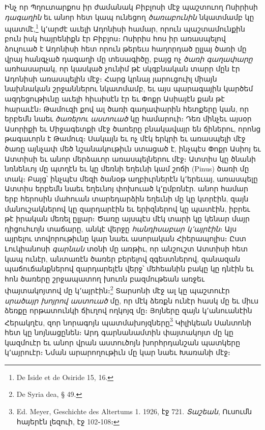 \documentclass{article}
\begin{document}
{Ինչ որ Պղուտարքոս իր ժամանակ Բիբլոսի մէջ պաշտուող Ոսիրիսի \emph{դագաղին} եւ անոր հետ կապ ունեցող \emph{ծառաբունին} նկատմամբ կը պատմէ,\footnote{De Iside et de Osiride 15, 16.} կ՚արժէ աւելի Ադոնիսի համար, որուն պաշտամունքին բուն իսկ հայրենիքն էր Բիբլոս։ Ոսիրիս հոս իր առասպելով ձուլուած է Ադոնիսի հետ որուն թերեւս հաղորդած ըլլայ ծառի մը վրայ հանգչած դագաղի մը տեսագիծը, բայց ոչ \emph{ծառի գաղափարը} առհասարակ, որ կասկած չունիմ թէ սկզբնական տարր մըն էր Ադոնիսի առասպելին մէջ։ Հարց կրնայ յարուցուիլ միայն նախնական շրջաններու նկատմամբ, եւ այս պարագային կարծեմ ազդեցութիւնը աւելի հիւսիսէն էր եւ Փոքր Ասիայէն քան թէ հարաւէն։ Թամուզի քով ալ ծառի գաղափարին հետքերը կան, որ երբեմն նաեւ \emph{ծառերու աստուած} կը համարուի։ Դեռ մինչեւ այսօր Ասորիքի եւ Միջագետքի մէջ ծառերը բնակավայր են ճիներու, որոնց թագաւորն է Թամուզ։ Սակայն եւ ոչ մէկ երկրի եւ առասպելի մէջ ծառը այնչափ մեծ նշանակութիւն ստացած է, ինչպէս Փոքր Ասիոյ եւ Ատտիսի եւ անոր մերձաւոր առասպելներու մէջ։ Ատտիս կը ծնանի նռնենւոյ մը պտղէն եւ կը մեռնի եղեւնի կամ շոճի (Pinus) ծառի մը տակ։ Բայց՝ ինչպէս մեզի ծանօթ աղբիւրներէն կ՚երեւայ, առասպելը Ատտիս երբեմն նաեւ եղեւնոյ փոխուած կ՚ըմբռնէր. անոր համար երբ հերոսին մահուան տարեդարձին եղեւնի մը կը կտրէին, զայն մանուշակներով կը զարդարէին եւ երիզներով կը պատէին, իբրեւ թէ իրական մեռել ըլլար։ Ծառը այսպէս մէկ տարի կը կենար մայր դիցուհւոյն տաճարը, անկէ վերջը \emph{հանդիսաբար կ՚այրէին}։ Այս այրելու տովորութիւնը կար նաեւ ասորական Հիերապոլիս։ Ըստ Լուկիանոսի \emph{գարնան} տօնի մը առթիւ, որ անշուշտ Ատտիսի հետ կապ ունէր, անտառէն ծառեր բերելով զգեստներով, զանազան պաճուճանքներով զարդարելէն վերջ՝ մեհեանին բակը կը դնէին եւ հոն ծառերը շրջապատող խուռն բազմութեան առջեւ փայտակոյտով մը կ՚այրէին։\footnote{De Syria dea, § 49.} Տարսոնի մէջ ալ կը պաշտուէր \emph{սրածայր խոյրով աստուած} մը, որ մէկ ձեռքն ունէր հասկ մը եւ միւս ձեռքը որթատունկի ճիւղով ողկոյզ մը։ Յոյները զայն կ՚անուանէին Հերակղէս, զոր նորագոյն պատմախոյզները\footnote{Ed. Meyer, Geschichte des Altertums 1. 1926, էջ 721. \emph{Տաշեան}, Ուսումն հայերէն լեզուի, էջ 102֊108։} Կիլիկեան Սանտոնի հետ կը նոյնացընեն։ Արդ գարնանամտին փայտակոյտ մը կը կազմուէր եւ անոր վրան աստուծոյն խորհրդանշան պատկերը կ՚այրուէր։ Նման արարողութիւն մը կար նաեւ Խառանի մէջ։

}
\end{document}
